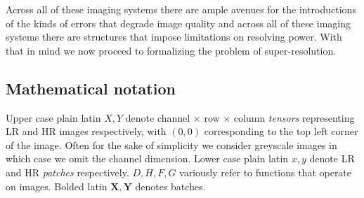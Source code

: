 Across all of these imaging systems there are ample avenues for the introductions of the kinds of errors that degrade image quality and across all of these imaging systems there are structures that impose limitations on resolving power.
%
With that in mind we now proceed to formalizing the problem of super-resolution.

\subsection{Mathematical notation}\label{subsec:notation}
Upper case plain latin $X, Y$ denote channel $\times$ row $\times$ column \textit{tensors} representing LR and HR images respectively, with $(0,0)$ corresponding to the top left corner of the image.
%
Often for the sake of simplicity we consider greyscale images in which case we omit the channel dimension.
%
Lower case plain latin $x, y$ denote LR and HR \textit{patches} respectively.
%
$D, H, F, G$ variously refer to functions that operate on images.
%
Bolded latin $\bm{X}, \bm{Y}$ denotes batches.

